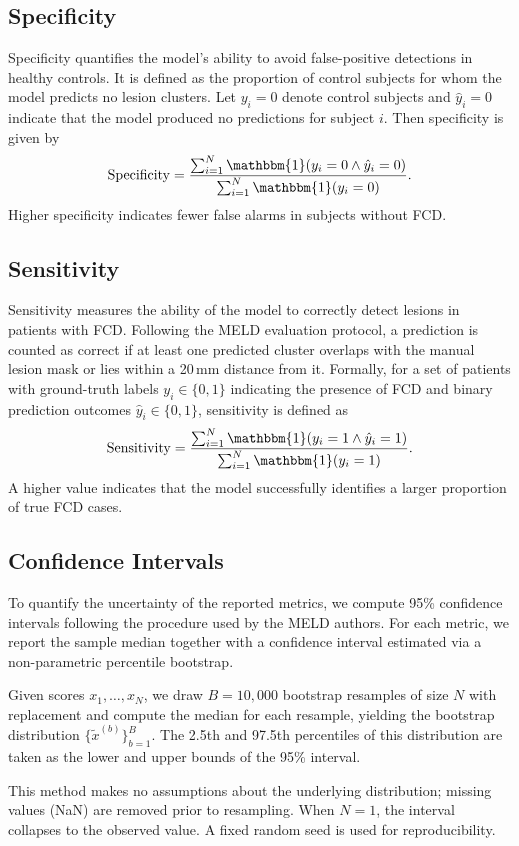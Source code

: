 \documentclass[FCD_GNN.tex]{subfiles}
\begin{document}
\subsection*{Specificity}
Specificity quantifies the model’s ability to avoid false-positive detections in healthy controls. 
It is defined as the proportion of control subjects for whom the model predicts no lesion clusters. 
Let $y_i = 0$ denote control subjects and $\hat{y}_i = 0$ indicate that the model produced no predictions 
for subject $i$. Then specificity is given by
\begin{equation}
\mathrm{Specificity} = 
\frac{\sum_{i=1}^{N} \mathbbm{1}(y_i = 0 \wedge \hat{y}_i = 0)}
{\sum_{i=1}^{N} \mathbbm{1}(y_i = 0)}.
\end{equation}
Higher specificity indicates fewer false alarms in subjects without FCD.

\subsection*{Sensitivity}
Sensitivity measures the ability of the model to correctly detect lesions in patients with FCD. 
Following the MELD evaluation protocol, a prediction is counted as correct if at least one predicted 
cluster overlaps with the manual lesion mask or lies within a 20\,mm distance from it. 
Formally, for a set of patients with ground-truth labels $y_i \in \{0,1\}$ indicating the presence of 
FCD and binary prediction outcomes $\hat{y}_i \in \{0,1\}$, sensitivity is defined as
\begin{equation}
\mathrm{Sensitivity} = 
\frac{\sum_{i=1}^{N} \mathbbm{1}(y_i = 1 \wedge \hat{y}_i = 1)}
{\sum_{i=1}^{N} \mathbbm{1}(y_i = 1)}.
\end{equation}
A higher value indicates that the model successfully identifies a larger proportion of true FCD cases.

\subsection*{Confidence Intervals}
To quantify the uncertainty of the reported metrics, we compute 95\% confidence intervals following the procedure used by the MELD authors. 
For each metric, we report the sample median together with a confidence interval estimated via a non-parametric percentile bootstrap.

Given scores $x_1, \dots, x_N$, we draw $B = 10{,}000$ bootstrap resamples of size $N$ with replacement and compute the median for each resample, yielding the bootstrap distribution $\{\tilde{x}^{(b)}\}_{b=1}^{B}$. 
The 2.5th and 97.5th percentiles of this distribution are taken as the lower and upper bounds of the 95\% interval.

This method makes no assumptions about the underlying distribution; missing values (NaN) are removed prior to resampling. 
When $N = 1$, the interval collapses to the observed value. A fixed random seed is used for reproducibility.
\end{document}
